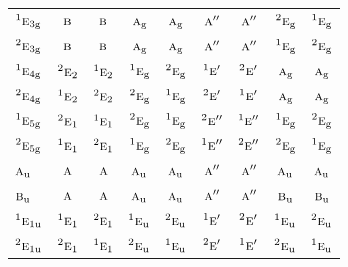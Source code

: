 \documentclass[10pt,a4paper]{article}
\numberwithin{equation}{section}
\newcommand{\irr}[1]{\text{\normalfont\scshape #1}}
\newcommand{\conjpair}[1]{{}^{#1}}
\newcommand{\ptag}[1]{\mathrm{#1}}
\begin{document}
{\begin{longtable}{@{}lcccccccc@{}}
$\conjpair{1}\irr{e}_{3\ptag{g}}$ & $\irr{b}$ & $\irr{b}$ & $\irr{a}_{\ptag{g}}$ & $\irr{a}_{\ptag{g}}$ & $\irr{a}''$ & $\irr{a}''$ & $\conjpair{2}\irr{e}_{\ptag{g}}$ & $\conjpair{1}\irr{e}_{\ptag{g}}$\\
$\conjpair{2}\irr{e}_{3\ptag{g}}$ & $\irr{b}$ & $\irr{b}$ & $\irr{a}_{\ptag{g}}$ & $\irr{a}_{\ptag{g}}$ & $\irr{a}''$ & $\irr{a}''$ & $\conjpair{1}\irr{e}_{\ptag{g}}$ & $\conjpair{2}\irr{e}_{\ptag{g}}$\\
$\conjpair{1}\irr{e}_{4\ptag{g}}$ & $\conjpair{2}\irr{e}_{2}$ & $\conjpair{1}\irr{e}_{2}$ & $\conjpair{1}\irr{e}_{\ptag{g}}$ & $\conjpair{2}\irr{e}_{\ptag{g}}$ & $\conjpair{1}\irr{e}'$ & $\conjpair{2}\irr{e}'$ & $\irr{a}_{\ptag{g}}$ & $\irr{a}_{\ptag{g}}$\\
$\conjpair{2}\irr{e}_{4\ptag{g}}$ & $\conjpair{1}\irr{e}_{2}$ & $\conjpair{2}\irr{e}_{2}$ & $\conjpair{2}\irr{e}_{\ptag{g}}$ & $\conjpair{1}\irr{e}_{\ptag{g}}$ & $\conjpair{2}\irr{e}'$ & $\conjpair{1}\irr{e}'$ & $\irr{a}_{\ptag{g}}$ & $\irr{a}_{\ptag{g}}$\\
$\conjpair{1}\irr{e}_{5\ptag{g}}$ & $\conjpair{2}\irr{e}_{1}$ & $\conjpair{1}\irr{e}_{1}$ & $\conjpair{2}\irr{e}_{\ptag{g}}$ & $\conjpair{1}\irr{e}_{\ptag{g}}$ & $\conjpair{2}\irr{e}''$ & $\conjpair{1}\irr{e}''$ & $\conjpair{1}\irr{e}_{\ptag{g}}$ & $\conjpair{2}\irr{e}_{\ptag{g}}$\\
$\conjpair{2}\irr{e}_{5\ptag{g}}$ & $\conjpair{1}\irr{e}_{1}$ & $\conjpair{2}\irr{e}_{1}$ & $\conjpair{1}\irr{e}_{\ptag{g}}$ & $\conjpair{2}\irr{e}_{\ptag{g}}$ & $\conjpair{1}\irr{e}''$ & $\conjpair{2}\irr{e}''$ & $\conjpair{2}\irr{e}_{\ptag{g}}$ & $\conjpair{1}\irr{e}_{\ptag{g}}$\\
$\irr{a}_{\ptag{u}}$ & $\irr{a}$ & $\irr{a}$ & $\irr{a}_{\ptag{u}}$ & $\irr{a}_{\ptag{u}}$ & $\irr{a}''$ & $\irr{a}''$ & $\irr{a}_{\ptag{u}}$ & $\irr{a}_{\ptag{u}}$\\
$\irr{b}_{\ptag{u}}$ & $\irr{a}$ & $\irr{a}$ & $\irr{a}_{\ptag{u}}$ & $\irr{a}_{\ptag{u}}$ & $\irr{a}''$ & $\irr{a}''$ & $\irr{b}_{\ptag{u}}$ & $\irr{b}_{\ptag{u}}$\\
$\conjpair{1}\irr{e}_{1\ptag{u}}$ & $\conjpair{1}\irr{e}_{1}$ & $\conjpair{2}\irr{e}_{1}$ & $\conjpair{1}\irr{e}_{\ptag{u}}$ & $\conjpair{2}\irr{e}_{\ptag{u}}$ & $\conjpair{1}\irr{e}'$ & $\conjpair{2}\irr{e}'$ & $\conjpair{1}\irr{e}_{\ptag{u}}$ & $\conjpair{2}\irr{e}_{\ptag{u}}$\\
$\conjpair{2}\irr{e}_{1\ptag{u}}$ & $\conjpair{2}\irr{e}_{1}$ & $\conjpair{1}\irr{e}_{1}$ & $\conjpair{2}\irr{e}_{\ptag{u}}$ & $\conjpair{1}\irr{e}_{\ptag{u}}$ & $\conjpair{2}\irr{e}'$ & $\conjpair{1}\irr{e}'$ & $\conjpair{2}\irr{e}_{\ptag{u}}$ & $\conjpair{1}\irr{e}_{\ptag{u}}$\\

\end{longtable}}
\end{document}
